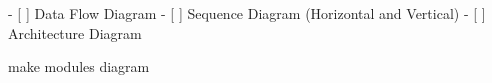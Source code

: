 - [ ]  Data Flow Diagram
- [ ]  Sequence Diagram (Horizontal and Vertical)
- [ ]  Architecture Diagram

make modules diagram